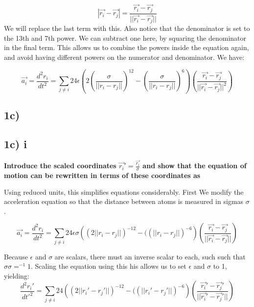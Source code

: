 \documentclass[a4paper,10pt,english]{article}
\begin{document}
\begin{equation}
|\vec{r_i} - \vec{r_j} | = \frac{ \vec{r_i} - \vec{r_j} }{ ||\vec{r_i} - \vec{r_j} ||}
\end{equation}
We will replace the last term with this. Also notice that the denominator is set to the 13th and 7th power. We can subtract one here, by squaring the denominator in the final term. This allows us to combine the powers inside the equation again, and avoid having different powers on the numerator and denominator. We have:

\begin{equation}
\vec{a_i} = \frac{d^2 r_i}{dt^2} =   \sum_{j \neq i} 24\epsilon \left( 2 (\frac{\sigma}{|| r_i - r_j||})^{12} -  (\frac{\sigma}{|| r_i - r_j||})^6 \right)(\frac{ \vec{r_i} - \vec{r_j} }{ ||\vec{r_i} - \vec{r_j} ||^2})
\end{equation}


\subsection*{1c)}

\subsection{1c) i}
\textbf{Introduce the scaled coordinates $\vec{r_i}'= \frac{\vec{r_i}}{\sigma}$ and show that the equation of motion can be rewritten in terms of these coordinates as}

Using reduced units, this simplifies equations considerably. First We modify the acceleration equation so that the distance between atoms is measured in sigmas $\sigma$. 

\begin{equation}
\vec{a_i}  =  \frac{d^2 r_i}{dt^2}  =  \sum_{j \neq i} 24 \epsilon \sigma \left(   ( 2 || r_i - r_j ||)^{-12} -   ((|| r_i - r_j ||)^{-6} \right)(\frac{ \vec{r_i} - \vec{r_j} }{ ||\vec{r_i} - \vec{r_j} ||})
\end{equation}

Because $\epsilon$ and $\sigma$ are scalars, there must an inverse scalar to each, such such that  $\sigma \sigma=^{-1} 1$. Scaling the equation using this his allows us to set $\epsilon$ and $\sigma$ to 1, yielding:
\begin{equation}
 \frac{d^2 r_i'}{dt'^2}  =  \sum_{j \neq i} 24  \left(   ( 2 || r_i' - r_j' ||)^{-12} -   ((|| r_i' - r_j' ||)^{-6} \right)(\frac{ \vec{r_i}' - \vec{r_j}' }{ ||\vec{r_i}' - \vec{r_j}' ||})
\end{equation}
\end{document}

